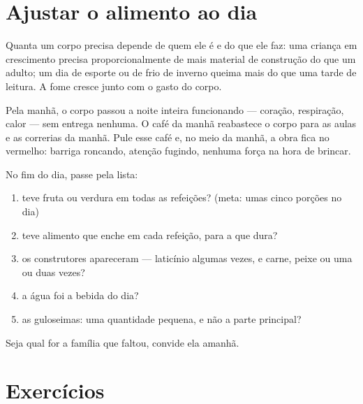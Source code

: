 \section{Ajustar o alimento ao dia}

\begin{proposition}\label{prop:g3:balanced-diet:needs}
Quanta  um corpo precisa depende de quem ele é e do que ele
faz: uma criança em crescimento precisa proporcionalmente de mais
material de construção do que um adulto; um dia de esporte ou de
frio de inverno queima mais  do que uma tarde de leitura. A
fome cresce junto com o gasto do corpo.
\end{proposition}
\admitted

\begin{example}\label{ex:g3:balanced-diet:breakfast}
Pela manhã, o corpo passou a noite inteira funcionando --- coração,
respiração, calor --- sem entrega nenhuma. O café da manhã reabastece
o corpo para as aulas e as correrias da manhã. Pule esse café e, no
meio da manhã, a obra fica no vermelho: barriga roncando, atenção
fugindo, nenhuma força na hora de brincar.
\end{example}

\begin{method}\label{met:g3:balanced-diet:check}
No fim do dia, passe pela lista:
\begin{enumerate}
  \item teve fruta ou verdura em todas as refeições? (meta: umas
        cinco porções no dia)
  \item teve alimento que enche em cada refeição, para a 
        que dura?
  \item os construtores apareceram --- laticínio algumas vezes, e
        carne, peixe ou  uma ou duas vezes?
  \item a água foi a bebida do dia?
  \item as guloseimas: uma quantidade pequena, e não a parte
        principal?
\end{enumerate}
Seja qual for a família que faltou, convide ela amanhã.
\end{method}

\section{Exercícios}

